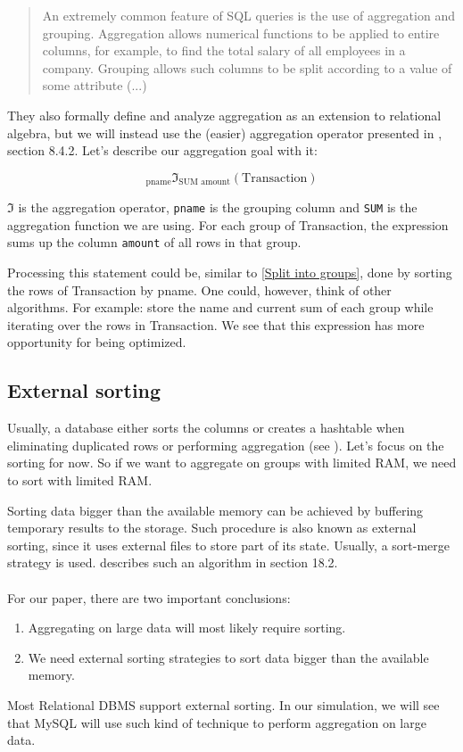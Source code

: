 \begin{quote}
An extremely common feature of SQL queries
is the use of aggregation and grouping. Aggregation allows numerical functions to be
applied to entire columns, for example, to find the total salary
of all employees in a company. Grouping allows such columns to be split
according to a value of some attribute (...)
\end{quote}
They also formally define and analyze aggregation as an extension to relational algebra,
but we will instead use the (easier) aggregation operator presented in \cite{Elma89},
section 8.4.2. Let's describe our aggregation goal with it:

\[
    _{\text{pname}}\mathfrak{I}_{\text{SUM amount}}(\text{Transaction})
\]

$\mathfrak{I}$ is the aggregation operator, \verb+pname+ is the grouping column 
and \verb+SUM+ is the aggregation function we are using. For each group of
Transaction, the expression sums up the column \verb+amount+
of all rows in that group.

Processing this statement could be, similar to \ref{Split into groups},
done by sorting the rows of Transaction by pname. One could, however,
think of other algorithms. For example:
store the name and current sum of each group while iterating over
the rows in Transaction.
We see that this expression has more opportunity for being optimized.

\subsection{External sorting} \label{External Sorting}

Usually, a database either sorts the columns or creates a hashtable
when eliminating duplicated rows or performing aggregation (see \cite{Edga}).
Let's focus on the sorting for now. So if we want to aggregate on groups
with limited \gls{RAM}, we need to sort with limited \gls{RAM}.

Sorting data bigger than the available memory can be achieved by buffering
temporary results to the storage. Such procedure is also known as external
sorting, since it uses external files to store part of its state. Usually,
a sort-merge strategy is used. \cite{Elma89} describes such an algorithm
in section 18.2. \\ \\
For our paper, there are two important conclusions:
\begin{enumerate}
    \item Aggregating on large data will most likely require sorting.
    \item We need external sorting strategies to sort data bigger than
the available memory.
\end{enumerate}
Most Relational \gls{DBMS} support external sorting. In our simulation,
we will see that \gls{MySQL} will use such kind of technique to perform
aggregation on large data.

